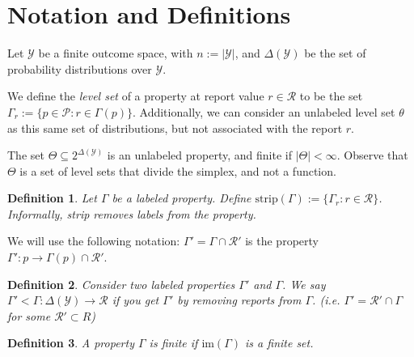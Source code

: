 \documentclass[12pt]{article}
\newcommand{\Comments}{1}
\newcommand{\mynote}[2]{\ifnum\Comments=1\textcolor{#1}{#2}\fi}
\newcommand{\jessie}[1]{\mynote{purple}{[JF: #1]}}
\renewcommand{\P}{\mathcal{P}}
\newcommand{\R}{\mathcal{R}}
\newcommand{\Y}{\mathcal{Y}}
\newcommand{\im}{\text{im}}
\newtheorem{definition}{Definition}
\begin{document}
\section{Notation and Definitions}

Let $\Y$ be a finite outcome space, with $n:=|\Y|$, and $\Delta(\Y)$ be the set of probability distributions over $\Y$.

We define the \emph{level set} of a property at report value $r\in\R$ to be the set $\Gamma_r := \{p\in\P : r \in \Gamma(p)\}$.
Additionally, we can consider an unlabeled level set $\theta$ as this same set of distributions, but not associated with the report $r$.

The set $\Theta \subseteq 2^{\Delta(\Y)}$ is an unlabeled property, and finite if $|\Theta| < \infty$.
Observe that $\Theta$ is a set of level sets that divide the simplex, and not a function.

\begin{definition}
Let $\Gamma$ be a labeled property.
Define $\text{strip}(\Gamma) := \{ \Gamma_r : r \in \R \}$.
Informally, strip removes labels from the property.
\end{definition}

We will use the following notation: $\Gamma' = \Gamma \cap \R'$ is the property $\Gamma' : p \to \Gamma(p) \cap \R'$.

\begin{definition}
  Consider two labeled properties $\Gamma'$ and $\Gamma$.
  We say $\Gamma' < \Gamma : \Delta(\Y) \to \R$ if you get $\Gamma'$ by removing reports from $\Gamma$.
  (i.e. $\Gamma' = \R' \cap \Gamma$ for some $\R' \subset R$)
\end{definition}

\begin{definition}
A property $\Gamma$ is \emph{finite} if $\im(\Gamma)$ is a finite set.
\end{definition}

\end{document}
